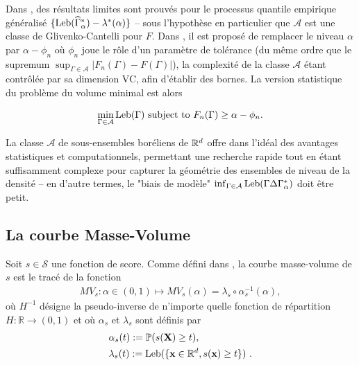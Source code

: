 Dans \cite{Polonik97}, des résultats limites sont prouvés pour le processus quantile empirique généralisé $ \{\text{Leb} (\widehat {\Gamma}^*_{\alpha}) - \lambda^*(\alpha) \} $ -- sous l'hypothèse en particulier que $ \mathcal{A} $ est une classe de Glivenko-Cantelli pour $ F $. Dans \cite {Scott2006}, il est proposé de remplacer le niveau $\alpha $ par $ \alpha- \phi_n $ où $ \phi_n $ joue le rôle d'un paramètre de tolérance (du même ordre que le supremum $\sup_{\Gamma\in \mathcal{A}}\vert F_n(\Gamma)-F(\Gamma) \vert$), la complexité de la classe $ \mathcal{A} $ étant contrôlée par sa dimension {\sc VC}, afin d'établir des bornes. La version statistique du problème du volume minimal est alors

$$
\min_{\Gamma \in \mathcal{A}} \text{Leb}(\Gamma) \mbox{ subject to } F_n (\Gamma) \ge \alpha - \phi_n.
$$

La classe $ \mathcal {A} $ de sous-ensembles boréliens de $ \mathbb{R}^d $ offre dans l'idéal des avantages statistiques et computationnels, permettant une recherche rapide tout en étant suffisamment complexe pour capturer la géométrie des ensembles de niveau de la densité -- en d'autre termes, le "biais de modèle" $ \inf_ {\Gamma \in \mathcal{A}} \text{Leb} (\Gamma \Delta \Gamma^*_\alpha) $ doit être petit.


\subsection{La courbe Masse-Volume}
\label{resume_fr:mv-curve}

Soit $s\in \mathcal{S}$ une fonction de score. Comme défini dans \cite{CLEM13,CLEM14}, la courbe masse-volume de $s$ est le tracé de la fonction
\begin{align*}
MV_s : \alpha\in (0,1)\mapsto MV_s(\alpha) = \lambda_s \circ \alpha_s^{-1}(\alpha),
\end{align*}
où $ H ^ {- 1} $ désigne la pseudo-inverse de n'importe quelle fonction de répartition $H: \mathbb {R} \rightarrow (0,1) $ et où $ \alpha_s $ et $ \lambda_s $ sont définis par
\begin{equation}
\begin{aligned}
\label{resume_fr:eq:alpha_beta}
&\alpha_s(t):= \mathbb{P}(s(\mathbf X) \ge t), \\
&\lambda_s(t):=\text{Leb}(\{\mathbf x \in \mathbb{R}^d, s(\mathbf x) \ge t\})~.
\end{aligned}
\end{equation}
%


